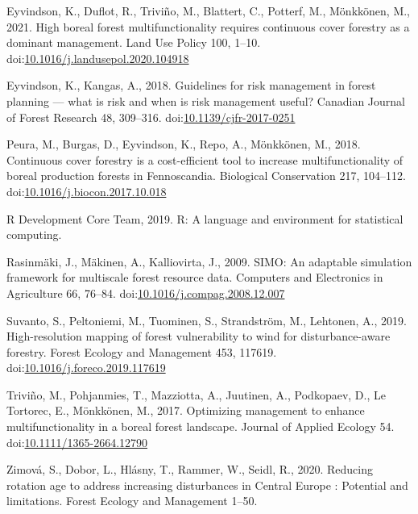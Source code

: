 \documentclass[]{elsarticle} %
\begin{document}
\hypertarget{ref-Eyvindson2020}{}
Eyvindson, K., Duflot, R., Triviño, M., Blattert, C., Potterf, M.,
Mönkkönen, M., 2021. High boreal forest multifunctionality requires
continuous cover forestry as a dominant management. Land Use Policy 100,
1--10.
doi:\href{https://doi.org/10.1016/j.landusepol.2020.104918}{10.1016/j.landusepol.2020.104918}

\hypertarget{ref-Eyvindson2018}{}
Eyvindson, K., Kangas, A., 2018. Guidelines for risk management in
forest planning --- what is risk and when is risk management useful?
Canadian Journal of Forest Research 48, 309--316.
doi:\href{https://doi.org/10.1139/cjfr-2017-0251}{10.1139/cjfr-2017-0251}

\hypertarget{ref-Peura2018}{}
Peura, M., Burgas, D., Eyvindson, K., Repo, A., Mönkkönen, M., 2018.
Continuous cover forestry is a cost-efficient tool to increase
multifunctionality of boreal production forests in Fennoscandia.
Biological Conservation 217, 104--112.
doi:\href{https://doi.org/10.1016/j.biocon.2017.10.018}{10.1016/j.biocon.2017.10.018}

\hypertarget{ref-RDevelopmentCoreTeam2019}{}
R Development Core Team, 2019. R: A language and environment for
statistical computing.

\hypertarget{ref-Rasinmaki2009}{}
Rasinmäki, J., Mäkinen, A., Kalliovirta, J., 2009. SIMO: An adaptable
simulation framework for multiscale forest resource data. Computers and
Electronics in Agriculture 66, 76--84.
doi:\href{https://doi.org/10.1016/j.compag.2008.12.007}{10.1016/j.compag.2008.12.007}

\hypertarget{ref-Suvanto2019}{}
Suvanto, S., Peltoniemi, M., Tuominen, S., Strandström, M., Lehtonen,
A., 2019. High-resolution mapping of forest vulnerability to wind for
disturbance-aware forestry. Forest Ecology and Management 453, 117619.
doi:\href{https://doi.org/10.1016/j.foreco.2019.117619}{10.1016/j.foreco.2019.117619}

\hypertarget{ref-Trivino2017}{}
Triviño, M., Pohjanmies, T., Mazziotta, A., Juutinen, A., Podkopaev, D.,
Le Tortorec, E., Mönkkönen, M., 2017. Optimizing management to enhance
multifunctionality in a boreal forest landscape. Journal of Applied
Ecology 54.
doi:\href{https://doi.org/10.1111/1365-2664.12790}{10.1111/1365-2664.12790}

\hypertarget{ref-Zimova2020}{}
Zimová, S., Dobor, L., Hlásny, T., Rammer, W., Seidl, R., 2020. Reducing
rotation age to address increasing disturbances in Central Europe :
Potential and limitations. Forest Ecology and Management 1--50.
\end{document}

